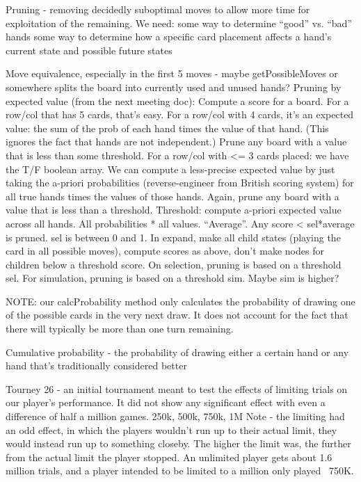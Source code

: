 \documentclass[letterpaper]{article}
\begin{document}
Pruning - removing decidedly suboptimal moves to allow more time for exploitation of the remaining.
We need:
	some way to determine “good” vs. “bad” hands
	some way to determine how a specific card placement affects a hand’s current state and possible future states
	
Move equivalence, especially in the first 5 moves - maybe getPossibleMoves or somewhere splits the board into currently used and unused hands?
Pruning by expected value (from the next meeting doc):
Compute a score for a board. For a row/col that has 5 cards, that’s easy. For a row/col with 4 cards, it’s an expected value: the sum of the prob of each hand times the value of that hand. (This ignores the fact that hands are not independent.) Prune any board with a value that is less than some threshold.
For a row/col with <= 3 cards placed: we have the T/F boolean array. We can compute a less-precise expected value by just taking the a-priori probabilities (reverse-engineer from British scoring system) for all true hands times the values of those hands. Again, prune any board with a value that is less than a threshold.
Threshold: compute a-priori expected value across all hands. All probabilities * all values. “Average”.  Any score < sel*average is pruned.  sel is between 0 and 1.
In expand, make all child states (playing the card in all possible moves), compute scores as above, don’t make nodes for children below a threshold score.
On selection, pruning is based on a threshold sel. For simulation, pruning is based on a threshold sim. Maybe sim is higher?

NOTE: our calcProbability method only calculates the probability of drawing one of the possible cards in the very next draw. It does not account for the fact that there will typically be more than one turn remaining.

Cumulative probability - the probability of drawing either a certain hand or any hand that’s traditionally considered better

Tourney 26 - an initial tournament meant to test the effects of limiting trials on our player’s performance. It did not show any significant effect with even a difference of half a million games. 
	250k, 500k, 750k, 1M
Note - the limiting had an odd effect, in which the players wouldn’t run up to their actual limit, they would instead run up to something closeby. The higher the limit was, the further from the actual limit the player stopped. An unlimited player gets about 1.6 million trials, and a player intended to be limited to a million only played ~750K. 
\end{document}

